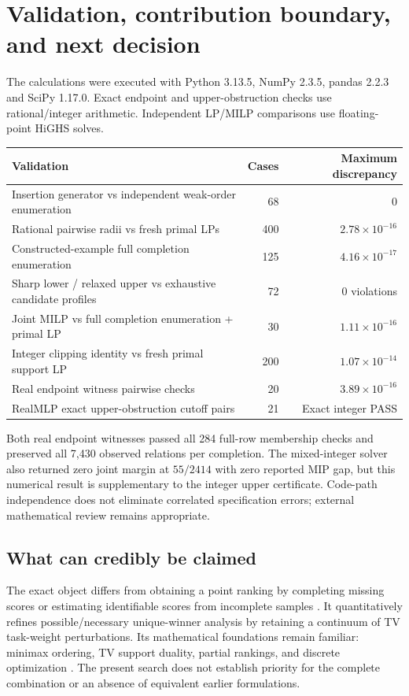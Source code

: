 \documentclass[11pt,a4paper]{article}
\begin{document}
\newpage
\section{Validation, contribution boundary, and next decision}
The calculations were executed with Python 3.13.5, NumPy 2.3.5, pandas 2.2.3 and
SciPy 1.17.0. Exact endpoint and upper-obstruction checks use rational/integer
arithmetic. Independent LP/MILP comparisons use floating-point HiGHS solves.
\begin{center}
\begin{tabularx}{\linewidth}{@{}Xrr@{}}\toprule
Validation & Cases & Maximum discrepancy\\\midrule
Insertion generator vs independent weak-order enumeration & 68 & 0\\
Rational pairwise radii vs fresh primal LPs & 400 & $2.78\times10^{-16}$\\
Constructed-example full completion enumeration & 125 & $4.16\times10^{-17}$\\
Sharp lower / relaxed upper vs exhaustive candidate profiles & 72 & 0 violations\\
Joint MILP vs full completion enumeration + primal LP & 30 & $1.11\times10^{-16}$\\
Integer clipping identity vs fresh primal support LP & 200 & $1.07\times10^{-14}$\\
Real endpoint witness pairwise checks & 20 & $3.89\times10^{-16}$\\
RealMLP exact upper-obstruction cutoff pairs & 21 & Exact integer PASS\\\bottomrule
\end{tabularx}
\end{center}
Both real endpoint witnesses passed all 284 full-row membership checks and
preserved all 7,430 observed relations per completion. The mixed-integer solver
also returned zero joint margin at $55/2414$ with zero reported MIP gap, but this
numerical result is supplementary to the integer upper certificate. Code-path
independence does not eliminate correlated specification errors; external
mathematical review remains appropriate.

\subsection*{What can credibly be claimed}
The exact object differs from obtaining a point ranking by completing missing
scores \cite{himmi} or estimating identifiable scores from incomplete samples
\cite{onebench}. It quantitatively refines possible/necessary unique-winner
analysis \cite{xia,chakraborty} by retaining a continuum of TV task-weight
perturbations. Its mathematical foundations remain familiar: minimax ordering,
TV support duality, partial rankings, and discrete optimization
\cite{tv,chains}. The present search does not establish priority for the complete
combination or an absence of equivalent earlier formulations.
\end{document}
